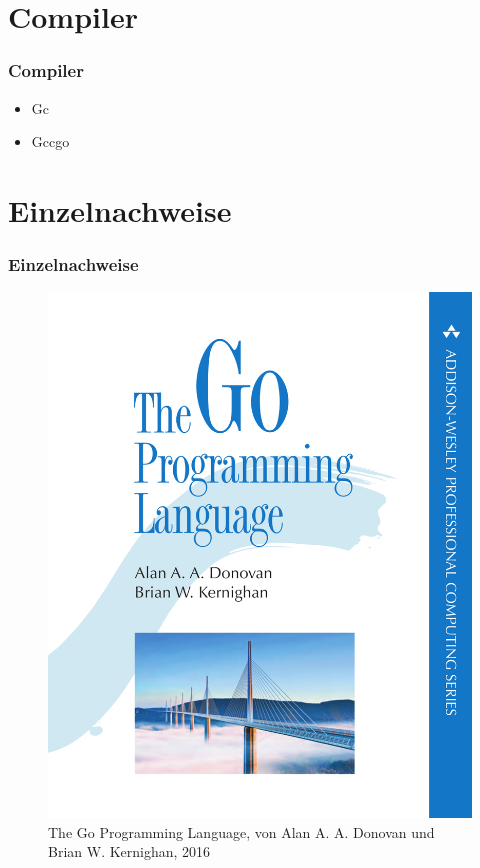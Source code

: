 \documentclass{beamer}
\begin{document}
\section{Compiler}
\begin{frame}
\frametitle{Compiler}

\begin{itemize}
\setlength{\itemsep}{20pt}
\item Gc
\item Gccgo
\end{itemize}

\end{frame}

\section{Einzelnachweise}
\begin{frame}
\frametitle{Einzelnachweise}


\begin{figure}
\includegraphics[scale=0.3]{book.png}
\caption{The Go Programming Language, von Alan A. A. Donovan und Brian W. Kernighan, 2016}
\end{figure}

\end{frame}
\end{document}

